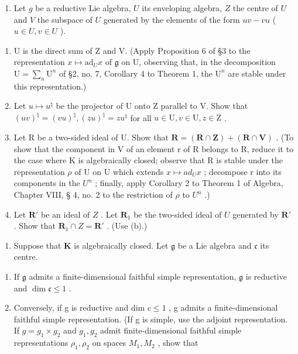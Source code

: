\begin{enumerate}
\def\labelenumi{\arabic{enumi}.}
\setcounter{enumi}{18}
\tightlist
\item
  Let \(g\) be a reductive Lie algebra, \(U\) its enveloping algebra, \(Z\) the centre of \(U\) and \(V\) the subspace of \(U\) generated by the elements of the form \(uv - vu\) ( \(u \in U, v \in U\) ).
\end{enumerate}

\begin{enumerate}
\def\labelenumi{(\alph{enumi})}
\item
  U is the direct sum of Z and V. (Apply Proposition 6 of §3 to the representation \(x \mapsto \mathrm{ad}_U x\) of \(\mathfrak{g}\) on U, observing that, in the decomposition \(\mathrm{U} = \sum_{n} \mathrm{U}^n\) of §2, no. 7, Corollary 4 to Theorem 1, the \(\mathrm{U}^n\) are stable under this representation.)
\item
  Let \(u \mapsto u^{\natural}\) be the projector of U onto Z parallel to V. Show that \((uv)^{\natural} = (vu)^{\natural}, (zu)^{\natural} = zu^{\natural}\) for all \(u \in \mathrm{U}, v \in \mathrm{U}, z \in \mathrm{Z}\) .
\item
  Let R be a two-sided ideal of U. Show that \(\mathbf{R} = (\mathbf{R} \cap \mathbf{Z}) + (\mathbf{R} \cap \mathbf{V})\) . (To show that the component in V of an element r of R belongs to R, reduce it to the case where K is algebraically closed; observe that R is stable under the representation \(\rho\) of U on U which extends \(x \mapsto ad_{U}x\) ; decompose r into its components in the \(U^{n}\) ; finally, apply Corollary 2 to Theorem 1 of Algebra, Chapter VIII, § 4, no. 2 to the restriction of \(\rho\) to \(U^{n}\) .)
\item
  Let \(\mathbf{R}'\) be an ideal of \(Z\) . Let \(\mathbf{R}_1\) be the two-sided ideal of \(U\) generated by \(\mathbf{R}'\) . Show that \(\mathbf{R}_1 \cap Z = \mathbf{R}'\) . (Use (b).)
\end{enumerate}

\begin{enumerate}
\def\labelenumi{\arabic{enumi}.}
\setcounter{enumi}{19}
\tightlist
\item
  Suppose that \(\mathbf{K}\) is algebraically closed. Let \(\mathfrak{g}\) be a Lie algebra and \(\mathfrak{c}\) its centre.
\end{enumerate}

\begin{enumerate}
\def\labelenumi{(\alph{enumi})}
\item
  If \(\mathfrak{g}\) admits a finite-dimensional faithful simple representation, \(\mathfrak{g}\) is reductive and \(\dim \mathfrak{c} \leqslant 1\) .
\item
  Conversely, if g is reductive and dim \(c \leqslant 1\) , g admits a finite-dimensional faithful simple representation. (If g is simple, use the adjoint representation. If \(g = g_{1} \times g_{2}\) and \(g_{1}, g_{2}\) admit finite-dimensional faithful simple representations \(\rho_{1}, \rho_{2}\) on spaces \(M_{1}, M_{2}\) , show that
\end{enumerate}

